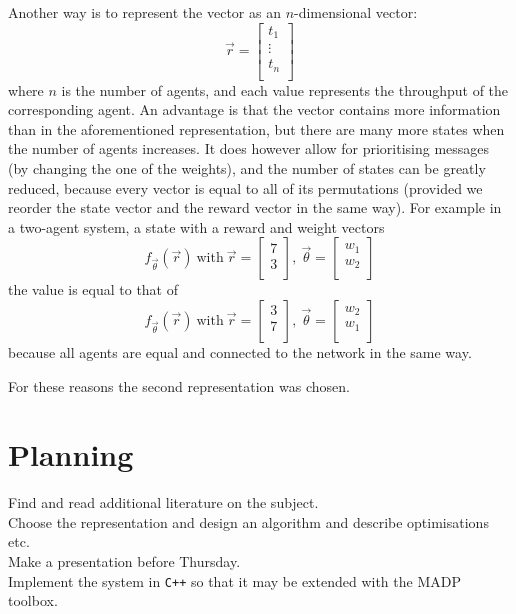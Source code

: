 \documentclass{article}
\begin{document}
\begin{multicols}{2}
		Another way is to represent the vector as an $n$-dimensional vector:
		$$\vec{r} = \begin{bmatrix}
			t_1\\
			\vdots\\
			t_n\\
		\end{bmatrix}$$
		where $n$ is the number of agents, and each value represents the
		throughput of the corresponding agent. An advantage is that the vector
		contains more information than in the aforementioned representation, but
		there are many more states when the number of agents increases. It does
		however allow for prioritising messages (by changing the one of the
		weights), and the number of states can be greatly reduced, because every
		vector is equal to all of its permutations (provided we reorder the state
		vector and the reward vector in the same way).
		For example in a two-agent system, a state with a reward and weight
		vectors
		$$ f_{\vec{\theta}}(\vec{r})~\textrm{with}~\vec{r} = \begin{bmatrix}
			7\\
			3\\
		\end{bmatrix},~
		\vec{\theta} = \begin{bmatrix}
			w_1\\
			w_2\\
		\end{bmatrix}$$
		the value is equal to that of
		$$ f_{\vec{\theta}}(\vec{r})~\textrm{with}~\vec{r} = \begin{bmatrix}
			3\\
			7\\
		\end{bmatrix},~
		\vec{\theta} = \begin{bmatrix}
			w_2\\
			w_1\\
		\end{bmatrix}$$
		because all agents are equal and connected to the network in the same
		way.

		For these reasons the second representation was chosen.
	\end{multicols}


	\section{Planning}
	\label{sec:planning}
	Find and read additional literature on the subject.\\
	Choose the representation and design an algorithm and describe optimisations
	etc.\\
	Make a presentation before Thursday.\\
	Implement the system in \texttt{C++} so that it may be extended with the
	MADP toolbox.
	\pagebreak

	
	
\end{document}
